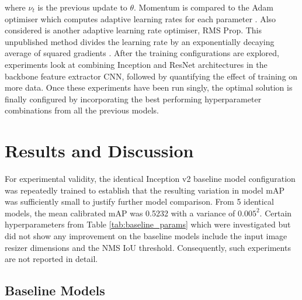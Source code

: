 \documentclass[journal]{IEEEtran}
\begin{document}
where $\nu_{t}$ is the previous update to $\theta$. Momentum is compared to the Adam optimiser which computes adaptive learning rates for each parameter \cite{adam}. Also considered is another adaptive learning rate optimiser, RMS Prop. This unpublished method divides the learning rate by an exponentially decaying average of squared gradients \cite{optimiserreviewpaper}. After the training configurations are explored, experiments look at combining Inception and ResNet architectures in the backbone feature extractor CNN, followed by quantifying the effect of training on more data. Once these experiments have been run singly, the optimal solution is finally configured by incorporating the best performing hyperparameter combinations from all the previous models.



































\section{Results and Discussion}\label{sec_results}


For experimental validity, the identical Inception v2 baseline model configuration was repeatedly trained to establish that the resulting variation in model mAP was sufficiently small to justify further model comparison. From 5 identical models, the mean calibrated mAP was 0.5232 with a variance of $0.005^2$. Certain hyperparameters from Table \ref{tab:baseline_params} which were investigated but did not show any improvement on the baseline models include the input image resizer dimensions and the NMS IoU threshold. Consequently, such experiments are not reported in detail.







\subsection{Baseline Models}
\end{document}
